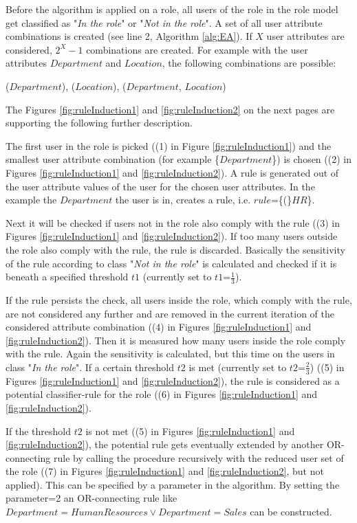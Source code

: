 \begin{itemize}
        	Before the algorithm is applied on a role, all users of the role in the role model get classified as "\textit{In the role}" or "\textit{Not in the role}". A set of all user attribute combinations is created (see line 2, Algorithm \ref{alg:EA}). If $X$ user attributes are considered, $2^X-1$ combinations are created. For example with the user attributes $Department$ and $Location$, the following combinations are possible:
        	
        	\centerline{($Department$), ($Location$), ($Department$, $Location$)}
        	
        	The Figures \ref{fig:ruleInduction1} and \ref{fig:ruleInduction2} on the next pages are supporting the following further description.
        	
        	The first user in the role is picked ((1) in Figure \ref{fig:ruleInduction1}) and the smallest user attribute combination (for example \{$Department$\}) is chosen ((2) in Figures \ref{fig:ruleInduction1} and \ref{fig:ruleInduction2}). A rule is generated out of the user attribute values of the user for the chosen user attributes. In the example the $Department$ the user is in, creates a rule, i.e. $rule$=\{(\}$HR$\}.
        	
        	Next it will be checked if users not in the role also comply with the rule ((3) in Figures \ref{fig:ruleInduction1} and \ref{fig:ruleInduction2}). If too many users outside the role also comply with the rule, the rule is discarded. Basically the sensitivity of the rule according to class "\textit{Not in the role}" is calculated and checked if it is beneath a specified threshold $t1$ (currently set to $t1$=$\frac{1}{3}$).
        	
        	If the rule persists the check, all users inside the role, which comply with the rule, are not considered any further and are removed in the current iteration of the considered attribute combination ((4) in Figures \ref{fig:ruleInduction1} and \ref{fig:ruleInduction2}). Then it is measured how many users inside the role comply with the rule. Again the sensitivity is calculated, but this time on the users in class "\textit{In the role}". If a certain threshold $t2$ is met (currently set to $t2$=$\frac{2}{3}$) ((5) in Figures \ref{fig:ruleInduction1} and \ref{fig:ruleInduction2}), the rule is considered as a potential classifier-rule for the role ((6) in Figures \ref{fig:ruleInduction1} and \ref{fig:ruleInduction2}).
        	
        	If the threshold $t2$ is not met ((5) in Figures \ref{fig:ruleInduction1} and \ref{fig:ruleInduction2}), the potential rule gets eventually extended by another OR-connecting rule by calling the procedure recursively with the reduced user set of the role ((7) in Figures \ref{fig:ruleInduction1} and \ref{fig:ruleInduction2}, but not applied). This can be specified by a parameter in the algorithm. By setting the parameter=2 an OR-connecting rule like $Department=HumanResources \vee Department=Sales$ can be constructed. 
        	

\end{itemize}
